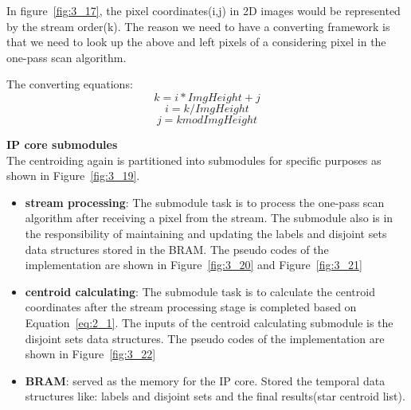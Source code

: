 
\noindent In figure~\ref{fig:3_17}, the pixel coordinates(i,j) in 2D images would be represented by the stream order(k). The reason we need to have a converting framework is that we need to look up the above and left pixels of a considering pixel in the one-pass scan algorithm. \\
	

\noindent The converting equations:
	$$k = i*ImgHeight + j$$
	$$i = k / ImgHeight$$
	$$j = k mod ImgHeight$$

\textbf{IP core submodules} \\

\noindent The centroiding again is partitioned into submodules for specific purposes as shown in Figure~\ref{fig:3_19}.


\begin{itemize}
	\item \textbf{stream processing}: The submodule task is to process the one-pass scan algorithm after receiving a pixel from the stream. The submodule also is in the responsibility of maintaining and updating the labels and disjoint sets data structures stored in the BRAM. The pseudo codes of the implementation are shown in Figure~\ref{fig:3_20} and Figure~\ref{fig:3_21}
	\item \textbf{centroid calculating}: The submodule task is to calculate the centroid coordinates after the stream processing stage is completed based on Equation~\ref{eq:2_1}. The inputs of the centroid calculating submodule is the disjoint sets data structures. The pseudo codes of the implementation are shown in Figure~\ref{fig:3_22}
	\item \textbf{BRAM}: served as the memory for the IP core. Stored the temporal data structures like: labels and disjoint sets and the final results(star centroid list).
\end{itemize}





